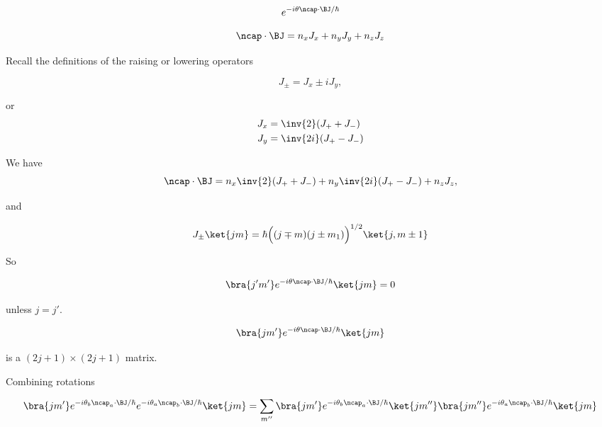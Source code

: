 \begin{equation}\label{eqn:qmTwoL17:80}
e^{-i \theta \ncap \cdot \BJ/\hbar}
\end{equation}

\begin{equation}\label{eqn:qmTwoL17:100}
\ncap \cdot \BJ = n_x J_x + n_y J_y + n_z J_z
\end{equation}

Recall the definitions of the raising or lowering operators

\begin{equation}\label{eqn:qmTwoL17:120}
J_\pm = J_x \pm i J_y,
\end{equation}

or
\begin{align}\label{eqn:qmTwoL17:140}
J_x &= \inv{2} (J_{+} + J_{-}) \\
J_y &= \inv{2i} (J_{+} - J_{-})
\end{align}

We have
\begin{equation}\label{eqn:qmTwoL17:160}
\ncap \cdot \BJ = 
n_x 
\inv{2} (J_{+} + J_{-})
+ 
n_y 
\inv{2i} (J_{+} - J_{-})
+ 
n_z J_z,
\end{equation}

and 

\begin{equation}\label{eqn:qmTwoL17:180}
J_\pm \ket{j m} = \hbar \Bigl(
(j \mp m)(j \pm m_1)
\Bigr)^{1/2}
\ket{j, m \pm 1}
\end{equation}

So

\begin{equation}\label{eqn:qmTwoL17:200}
\bra{j' m'} e^{-i \theta \ncap \cdot \BJ/\hbar} \ket{j m} = 0
\end{equation}

unless $j = j'$.

\begin{equation}\label{eqn:qmTwoL17:220}
\bra{j m'} e^{-i \theta \ncap \cdot \BJ/\hbar} \ket{j m}
\end{equation}

is a $(2j + 1) \times (2 j+ 1)$ matrix.

Combining rotations

\begin{equation}\label{eqn:qmTwoL17:240}
\bra{j m'} 
e^{-i \theta_b \ncap_a \cdot \BJ/\hbar}
e^{-i \theta_a \ncap_b \cdot \BJ/\hbar}
 \ket{j m}
=
\sum_{m''}
\bra{j m'} 
e^{-i \theta_b \ncap_a \cdot \BJ/\hbar}
\ket{j m''} \bra{j m''}
e^{-i \theta_a \ncap_b \cdot \BJ/\hbar}
 \ket{j m}
\end{equation}

